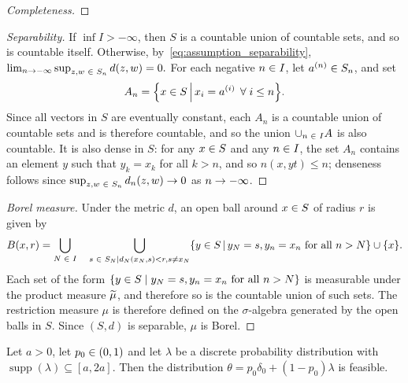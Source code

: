 \documentclass[AHL,Unicode]{cedram}
\DeclareMathOperator{\supp}{supp}
\newcommand*\all{\forall}
\newcommand*\union{\cup}
\let\originalleft\left
\let\originalright\right
\renewcommand{\left}{\mathopen{}\mathclose\bgroup\originalleft}
\renewcommand{\right}{\aftergroup\egroup\originalright}
\renewcommand*{\to}{\mathchoice{\longrightarrow}{\rightarrow}{\rightarrow}{\rightarrow}}
\let\oldin\in
\renewcommand{\in}{\mathchoice{\oldin}{\oldin}{\,\oldin\,}{\,\oldin\,}}
\let\oldtilde\tilde
\renewcommand*{\tilde}[1]{\mathchoice{\widetilde{#1}}{\widetilde{#1}}{\oldtilde{#1}}{\oldtilde{#1}}}
\let\oldforall\forall
\renewcommand*{\forall}{\mathrel{\oldforall}}
\begin{document}
\begin{proofc}
\begin{proof}[{Completeness}]
\end{proof}
\begin{proof}[{Separability}] 
If $\inf I>-\infty$, then $S$ is a countable union of countable sets, and so is countable itself. Otherwise, by~\eqref{eq:assumption_separability}, $\lim_{n\to-\infty}\sup_{z,w\in S_{n}}d(z,w)=0.$ For each negative $n\in I$, let $a^{(n)}\in S_{n}$, and set
\[
A_{n}=\left\{ x\in S\,\middle|\, x_{i}=a^{\left(i\right)}\,\all i\leq n\right\}.
\]
Since all vectors in $S$ are eventually constant, each $A_{n}$ is a countable union of countable sets and is therefore countable, and so the union $\union_{n\in I}A$ is also countable. It is also dense in $S$: for any $x\in S$ and any $n\in I$, the set $A_{n}$ contains an element $y$ such that $y_{k}=x_{k}$ for all $k>n$, and so $n(x,yt)\leq n$; denseness follows since $\sup_{z,w\in S_{n}}d_{n}(z,w)\to0$ as $n\to-\infty$.\let\qed\relax
\end{proof}

\begin{proof}[{Borel measure}]
Under the metric $d$, an open ball around $x\in S$ of radius $r$ is given by
\[
B\left(x,r\right)=\bigcup_{N\in I}\quad\bigcup_{s\in S_{N}\mid d_{N}\left(x_{N},s\right)<r,s\neq x_{N}}\left\{ y\in S\,\middle|\, y_{N}=s,y_{n}=x_{n}\text{ for all }n>N\right\} \union\left\{ x\right\}.
\]
Each set of the form $\{ y\in S\mid y_{N}=s,y_{n}=x_{n}\text{ for all } n>N\} $ is measurable under the product measure $\tilde{\mu}$, and therefore so is the countable union of such sets. The restriction measure $\mu$ is therefore defined on the $\sigma$-algebra generated by the open balls in $S$. Since $(S,d)$ is separable, $\mu$ is Borel.
\end{proof}\let\qed\relax
\end{proofc}
\begin{prop}\label{prop:positive_interval_is_feasible}
Let $a>0$, let $p_{0}\in(0,1)$
and let $\lambda$ be a discrete probability distribution with $\supp(\lambda)\subseteq[a,2a].
$
Then the distribution $\theta=p_{0}\delta_{0}+(1-p_{0})\lambda$ is feasible.
\end{prop}
\end{document}
